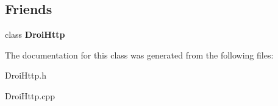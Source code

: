 \subsection*{Friends}
\begin{DoxyCompactItemize}
\item 
\mbox{\label{class_droi_http_request_ad04cb70e678402e663c95435df2a194e}} 
class {\bfseries Droi\+Http}
\end{DoxyCompactItemize}


The documentation for this class was generated from the following files\+:\begin{DoxyCompactItemize}
\item 
Droi\+Http.\+h\item 
Droi\+Http.\+cpp\end{DoxyCompactItemize}
